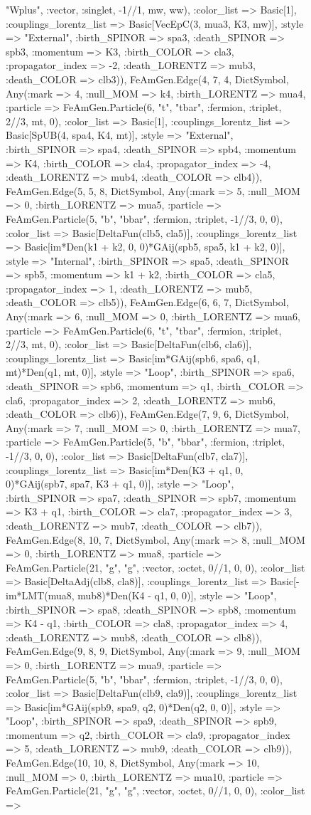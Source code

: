 \documentclass{revtex4}
\begin{document}
\begin{figure}[!htb]
\begin{center}
{"Wplus", :vector, :singlet, -1//1, mw, ww), :color_list => Basic[1], :couplings_lorentz_list => Basic[VecEpC(3, mua3, K3, mw)], :style => "External", :birth_SPINOR => spa3, :death_SPINOR => spb3, :momentum => K3, :birth_COLOR => cla3, :propagator_index => -2, :death_LORENTZ => mub3, :death_COLOR => clb3)), FeAmGen.Edge(4, 7, 4, Dict{Symbol, Any}(:mark => 4, :null_MOM => k4, :birth_LORENTZ => mua4, :particle => FeAmGen.Particle(6, "t", "tbar", :fermion, :triplet, 2//3, mt, 0), :color_list => Basic[1], :couplings_lorentz_list => Basic[SpUB(4, spa4, K4, mt)], :style => "External", :birth_SPINOR => spa4, :death_SPINOR => spb4, :momentum => K4, :birth_COLOR => cla4, :propagator_index => -4, :death_LORENTZ => mub4, :death_COLOR => clb4)), FeAmGen.Edge(5, 5, 8, Dict{Symbol, Any}(:mark => 5, :null_MOM => 0, :birth_LORENTZ => mua5, :particle => FeAmGen.Particle(5, "b", "bbar", :fermion, :triplet, -1//3, 0, 0), :color_list => Basic[DeltaFun(clb5, cla5)], :couplings_lorentz_list => Basic[im*Den(k1 + k2, 0, 0)*GAij(spb5, spa5, k1 + k2, 0)], :style => "Internal", :birth_SPINOR => spa5, :death_SPINOR => spb5, :momentum => k1 + k2, :birth_COLOR => cla5, :propagator_index => 1, :death_LORENTZ => mub5, :death_COLOR => clb5)), FeAmGen.Edge(6, 6, 7, Dict{Symbol, Any}(:mark => 6, :null_MOM => 0, :birth_LORENTZ => mua6, :particle => FeAmGen.Particle(6, "t", "tbar", :fermion, :triplet, 2//3, mt, 0), :color_list => Basic[DeltaFun(clb6, cla6)], :couplings_lorentz_list => Basic[im*GAij(spb6, spa6, q1, mt)*Den(q1, mt, 0)], :style => "Loop", :birth_SPINOR => spa6, :death_SPINOR => spb6, :momentum => q1, :birth_COLOR => cla6, :propagator_index => 2, :death_LORENTZ => mub6, :death_COLOR => clb6)), FeAmGen.Edge(7, 9, 6, Dict{Symbol, Any}(:mark => 7, :null_MOM => 0, :birth_LORENTZ => mua7, :particle => FeAmGen.Particle(5, "b", "bbar", :fermion, :triplet, -1//3, 0, 0), :color_list => Basic[DeltaFun(clb7, cla7)], :couplings_lorentz_list => Basic[im*Den(K3 + q1, 0, 0)*GAij(spb7, spa7, K3 + q1, 0)], :style => "Loop", :birth_SPINOR => spa7, :death_SPINOR => spb7, :momentum => K3 + q1, :birth_COLOR => cla7, :propagator_index => 3, :death_LORENTZ => mub7, :death_COLOR => clb7)), FeAmGen.Edge(8, 10, 7, Dict{Symbol, Any}(:mark => 8, :null_MOM => 0, :birth_LORENTZ => mua8, :particle => FeAmGen.Particle(21, "g", "g", :vector, :octet, 0//1, 0, 0), :color_list => Basic[DeltaAdj(clb8, cla8)], :couplings_lorentz_list => Basic[-im*LMT(mua8, mub8)*Den(K4 - q1, 0, 0)], :style => "Loop", :birth_SPINOR => spa8, :death_SPINOR => spb8, :momentum => K4 - q1, :birth_COLOR => cla8, :propagator_index => 4, :death_LORENTZ => mub8, :death_COLOR => clb8)), FeAmGen.Edge(9, 8, 9, Dict{Symbol, Any}(:mark => 9, :null_MOM => 0, :birth_LORENTZ => mua9, :particle => FeAmGen.Particle(5, "b", "bbar", :fermion, :triplet, -1//3, 0, 0), :color_list => Basic[DeltaFun(clb9, cla9)], :couplings_lorentz_list => Basic[im*GAij(spb9, spa9, q2, 0)*Den(q2, 0, 0)], :style => "Loop", :birth_SPINOR => spa9, :death_SPINOR => spb9, :momentum => q2, :birth_COLOR => cla9, :propagator_index => 5, :death_LORENTZ => mub9, :death_COLOR => clb9)), FeAmGen.Edge(10, 10, 8, Dict{Symbol, Any}(:mark => 10, :null_MOM => 0, :birth_LORENTZ => mua10, :particle => FeAmGen.Particle(21, "g", "g", :vector, :octet, 0//1, 0, 0), :color_list => }
\end{center}
\end{figure}
\end{document}
